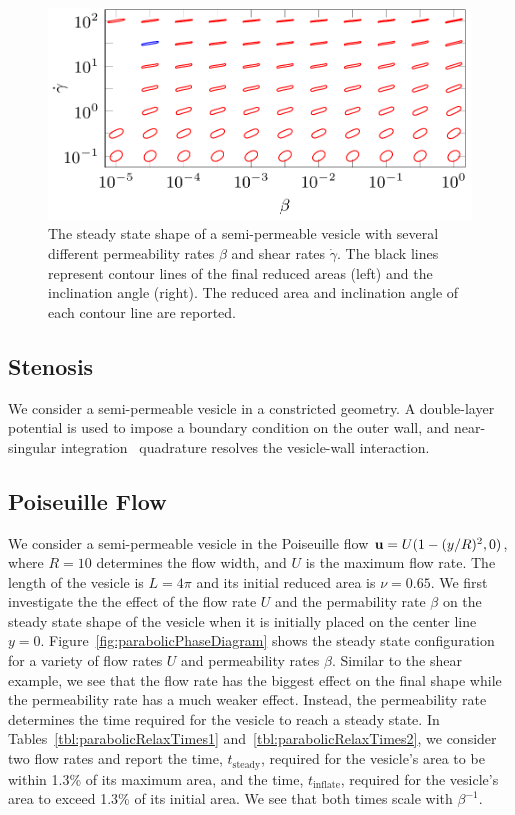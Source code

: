 \documentclass[9pt,twocolumn,twoside,lineno]{pnas-new}
\newif\ifTikz
\begin{document}
\begin{figure}[htp]
  \centering
  \includegraphics[width=\linewidth]{figures/shearPhaseDiagramRA2.pdf}
  \caption{\label{fig:shearPhaseDiagram} The steady state shape of a
  semi-permeable vesicle with several different permeability rates
  $\beta$ and shear rates $\dot{\gamma}$. The black lines represent
  contour lines of the final reduced areas (left) and the inclination
  angle (right). The reduced area and inclination angle of each contour
  line are reported.}
\end{figure}

\subsection*{Stenosis}
We consider a semi-permeable vesicle in a constricted geometry. A
double-layer potential is used to impose a boundary condition on the
outer wall, and near-singular integration~\cite{qua-bir2014} quadrature
resolves the vesicle-wall interaction.

\subsection*{Poiseuille Flow}
We consider a semi-permeable vesicle in the Poiseuille flow $\mathbf{u} =
U(1-(y/R)^2,0)$, where $R=10$ determines the flow width, and $U$ is the
maximum flow rate. The length of the vesicle is $L = 4\pi$ and its
initial reduced area is $\nu = 0.65$. We first investigate the the
effect of the flow rate $U$ and the permability rate $\beta$ on the
steady state shape of the vesicle when it is initially placed on the
center line $y=0$. Figure~\ref{fig:parabolicPhaseDiagram} shows the
steady state configuration for a variety of flow rates $U$ and
permeability rates $\beta$. Similar to the shear example, we see that
the flow rate has the biggest effect on the final shape while the
permeability rate has a much weaker effect. Instead, the permeability
rate determines the time required for the vesicle to reach a steady
state. In Tables~\ref{tbl:parabolicRelaxTimes1}
and~\ref{tbl:parabolicRelaxTimes2}, we consider two flow rates and
report the time, $t_\mathrm{steady}$, required for the vesicle's area to
be within 1.3\% of its maximum area, and the time, $t_\mathrm{inflate}$,
required for the vesicle's area to exceed 1.3\% of its initial area. We
see that both times scale with $\beta^{-1}$. 
\end{document}

